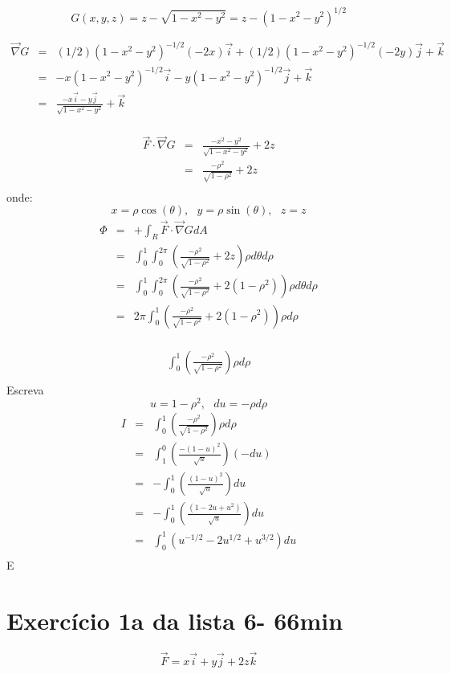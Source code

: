 \documentclass[a4paper,10pt]{book}
\begin{document}
$$G(x,y,z)=z-\sqrt{1-x^2-y^2}=z-(1-x^2-y^2)^{1/2}$$

\begin{eqnarray*}
 \vec{\nabla}G&=& (1/2)(1-x^2-y^2)^{-1/2}(-2x)\vec{i}+(1/2)(1-x^2-y^2)^{-1/2}(-2y)\vec{j} + \vec{k}\\
 &=& -x(1-x^2-y^2)^{-1/2}\vec{i}-y(1-x^2-y^2)^{-1/2}\vec{j} + \vec{k}\\
 &=& \frac{-x\vec{i}-y\vec{j}}{\sqrt{1-x^2-y^2}} + \vec{k}\\
  \end{eqnarray*}

\begin{eqnarray*}
 \vec{F}\cdot\vec{\nabla}G&=&  \frac{-x^2-y^2}{\sqrt{1-x^2-y^2}} + 2z\\
 &=&  \frac{-\rho^2}{\sqrt{1-\rho^2}} + 2z\\
  \end{eqnarray*}
onde:
$$x=\rho\cos(\theta), ~~~y=\rho\sin(\theta), ~~~z=z$$
  \begin{eqnarray*}
\Phi&=&+\int_R\vec{F}\cdot\vec{\nabla}GdA\\
&=&\int_0^1\int_0^{2\pi}\left(\frac{-\rho^2}{\sqrt{1-\rho^2}} + 2z\right)\rho d\theta d\rho\\
&=&\int_0^1\int_0^{2\pi}\left(\frac{-\rho^2}{\sqrt{1-\rho^2}} + 2(1-\rho^2)\right)\rho d\theta d\rho\\
&=&2\pi\int_0^1\left(\frac{-\rho^2}{\sqrt{1-\rho^2}} + 2(1-\rho^2)\right)\rho  d\rho\\
  \end{eqnarray*}
 
 \begin{eqnarray*}
  \int_0^1\left(\frac{-\rho^2}{\sqrt{1-\rho^2}} \right)\rho  d\rho\\
 \end{eqnarray*}
Escreva 
$$u=1-\rho^2,~~~du=-\rho d\rho$$
\begin{eqnarray*}
 I&=& \int_0^1\left(\frac{-\rho^2}{\sqrt{1-\rho^2}} \right)\rho  d\rho\\
 &=&
 \int_1^0\left(\frac{-(1-u)^2}{\sqrt{u}} \right)(-du)\\
 &=&
 -\int_0^1\left(\frac{(1-u)^2}{\sqrt{u}} \right)du\\
 &=& -\int_0^1\left(\frac{(1-2u+u^2)}{\sqrt{u}} \right)du\\
 &=&\int_0^1\left(u^{-1/2}-2u^{1/2}+u^{3/2}\right)du\\
  \end{eqnarray*}
E
 
 \section{Exercício 1a da lista 6- 66min} 
 $$\vec{F}=x\vec{i}+y\vec{j}+2z\vec{k}$$
 
\end{document}
